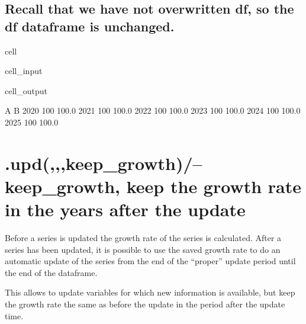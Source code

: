 \documentclass[letterpaper,10pt,english]{jupyterBook}
\begin{document}
\subsection{Recall  that we have not overwritten df, so the df dataframe is unchanged.}
\label{\detokenize{content/howto/update/model update:recall-that-we-have-not-overwritten-df-so-the-df-dataframe-is-unchanged}}
\begin{sphinxuseclass}{cell}\begin{sphinxVerbatimInput}

\begin{sphinxuseclass}{cell_input}
\begin{sphinxVerbatim}[commandchars=\\\{\}]
\end{sphinxVerbatim}

\end{sphinxuseclass}\end{sphinxVerbatimInput}
\begin{sphinxVerbatimOutput}

\begin{sphinxuseclass}{cell_output}
\begin{sphinxVerbatim}[commandchars=\\\{\}]
        A      B
2020  100  100.0
2021  100  100.0
2022  100  100.0
2023  100  100.0
2024  100  100.0
2025  100  100.0
\end{sphinxVerbatim}

\end{sphinxuseclass}\end{sphinxVerbatimOutput}

\end{sphinxuseclass}

\section{.upd(,,,keep\_growth)/–keep\_growth, keep the growth rate in the years after the update}
\label{\detokenize{content/howto/update/model update:upd-keep-growth-keep-growth-keep-the-growth-rate-in-the-years-after-the-update}}
\sphinxAtStartPar
Before a series is updated the growth rate of the series is calculated. After a series has been updated, it is possible to use the saved growth rate to do an automatic update of the series from the end of the “proper” update period until the end of the dataframe.

\sphinxAtStartPar
This allows to update variables for which new information is available, but keep the growth rate the same as before the update in the period after the update time.
\end{document}
